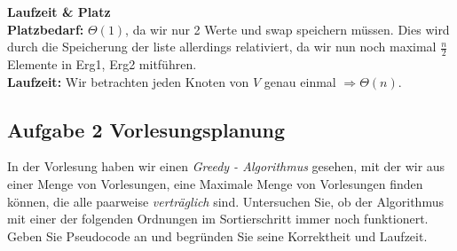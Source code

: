 \documentclass[11pt,a4paper,ngerman]{article}
\begin{document}
\begin{enumerate}[\bfseries (a)]
\begin{description}
\item{\bfseries Laufzeit \& Platz}\\
\textbf{Platzbedarf:} $\Theta (1)$, da wir nur 2 Werte und swap speichern müssen. Dies wird durch die Speicherung der liste allerdings relativiert, da wir nun noch maximal $\frac{n}{2}$ Elemente in Erg1, Erg2 mitführen.\\

\textbf{Laufzeit:} Wir betrachten jeden Knoten von $V$ genau einmal $\Rightarrow \Theta (n)$.

\end{description}

\end{enumerate}

\pagebreak

\subsection*{Aufgabe 2 \mdseries Vorlesungsplanung}

In der Vorlesung haben wir einen \emph{Greedy - Algorithmus} gesehen, mit der wir aus einer Menge von Vorlesungen, eine Maximale Menge von Vorlesungen finden können, die alle paarweise \emph{verträglich} sind. Untersuchen Sie, ob der Algorithmus mit einer der folgenden Ordnungen im Sortierschritt immer noch funktionert. Geben Sie Pseudocode an und begründen Sie seine Korrektheit und Laufzeit.
\end{document}
